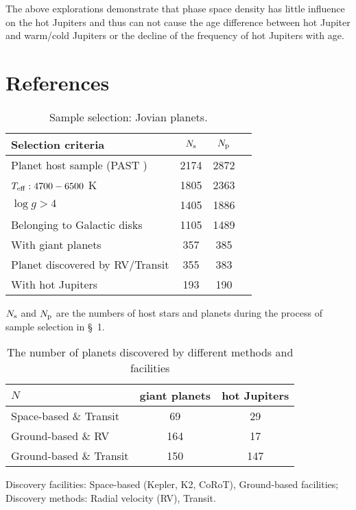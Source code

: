 \documentclass[twocolumn]{pnas-new}
\begin{document}
The above explorations demonstrate that phase space density has little influence on the hot Jupiters and thus can not cause the age difference between hot Jupiter and warm/cold Jupiters or the decline of the frequency of hot Jupiters with age.



\section*{References}


\clearpage

\begin{table*}[!t]
\renewcommand\arraystretch{1.0}
\centering
\caption{Sample selection: Jovian planets.}
{\footnotesize
\label{tab:sampleprocedure}
\linespread{1.8}
\begin{tabular}{l|ccc} \hline
Selection criteria & $N_{\rm s}$ & $N_{\rm p}$ \\\hline
Planet host sample (PAST \uppercase\expandafter{\romannumeral1}) & 2174 & 2872 \\
$T_{\rm eff}:4700-6500$ K & 1805 & 2363 \\
$\log g>4$ &  1405 & 1886 \\
Belonging to Galactic disks & 1105 & 1489 \\ 
With giant planets & 357 & 385 \\ 
{Planet discovered by RV/Transit} & 355 & 383 \\
With hot Jupiters & 193  & 190 \\
\hline
\end{tabular}}
\flushleft
{\centering $N_{\rm s}$ and $N_{\rm p}$ are the numbers of host stars and planets during the process of sample selection in \S~1.}
\end{table*}

\begin{table*}[!t]
\renewcommand\arraystretch{1.2}
\centering
\caption{The number of planets discovered by different methods and facilities}
{\footnotesize
\label{tab:planetnumberdisc}
\begin{tabular}{lcc} \hline
     $N$    &  giant planets   & hot Jupiters  \\ \hline
   Space-based \& Transit &  69 & 29   \\ 
   Ground-based \& RV  & 164 & 17\\ 
   Ground-based \& Transit  &  150 & 147  \\ \hline

\end{tabular}}
\flushleft
{Discovery facilities: Space-based (Kepler, K2, CoRoT), Ground-based facilities; \\
Discovery methods: Radial velocity (RV), Transit.}
\end{table*}
\end{document}
